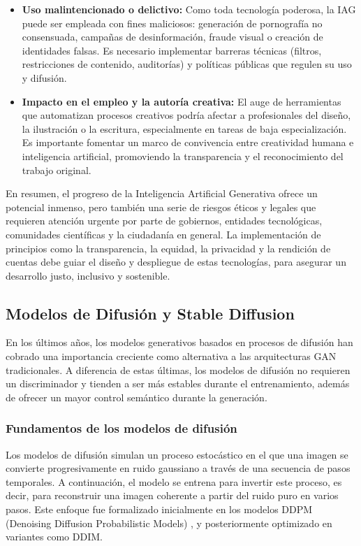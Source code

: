 \begin{itemize}
    \item \textbf{Uso malintencionado o delictivo:} Como toda tecnología poderosa, la IAG puede ser empleada con fines maliciosos: generación de pornografía no consensuada, campañas de desinformación, fraude visual o creación de identidades falsas. Es necesario implementar barreras técnicas (filtros, restricciones de contenido, auditorías) y políticas públicas que regulen su uso y difusión.
    
    \item \textbf{Impacto en el empleo y la autoría creativa:} El auge de herramientas que automatizan procesos creativos podría afectar a profesionales del diseño, la ilustración o la escritura, especialmente en tareas de baja especialización. Es importante fomentar un marco de convivencia entre creatividad humana e inteligencia artificial, promoviendo la transparencia y el reconocimiento del trabajo original.
\end{itemize}

En resumen, el progreso de la Inteligencia Artificial Generativa ofrece un potencial inmenso, pero también una serie de riesgos éticos y legales que requieren atención urgente por parte de gobiernos, entidades tecnológicas, comunidades científicas y la ciudadanía en general. La implementación de principios como la transparencia, la equidad, la privacidad y la rendición de cuentas debe guiar el diseño y despliegue de estas tecnologías, para asegurar un desarrollo justo, inclusivo y sostenible.

\subsection{Modelos de Difusión y Stable Diffusion}

En los últimos años, los modelos generativos basados en procesos de difusión han cobrado una importancia creciente como alternativa a las arquitecturas GAN tradicionales. A diferencia de estas últimas, los modelos de difusión no requieren un discriminador y tienden a ser más estables durante el entrenamiento, además de ofrecer un mayor control semántico durante la generación.

\subsubsection{Fundamentos de los modelos de difusión}

Los modelos de difusión simulan un proceso estocástico en el que una imagen se convierte progresivamente en ruido gaussiano a través de una secuencia de pasos temporales. A continuación, el modelo se entrena para invertir este proceso, es decir, para reconstruir una imagen coherente a partir del ruido puro en varios pasos. Este enfoque fue formalizado inicialmente en los modelos DDPM (Denoising Diffusion Probabilistic Models) \cite{ho2020denoising}, y posteriormente optimizado en variantes como DDIM.

